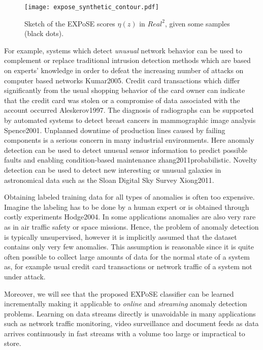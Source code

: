     \begin{figure}[tb]
    	\centering
    	\texttt{[image: expose\_synthetic\_contour.pdf]}
    	\caption{Sketch of the EXPoSE scores $\eta(z)$ in $Real^2$, given some samples (black dots).}
    	\label{fig:expose_synthetic_contour}
    \end{figure}
    

%
For example, systems which detect \emph{unusual} network behavior can be used to complement or replace traditional intrusion detection methods which are based on experts' knowledge in order to defeat the increasing number of attacks on computer based networks {Kumar2005}. Credit card transactions which differ significantly from the usual shopping behavior of the card owner can indicate that the credit card was stolen or a compromise of data associated with the account occurred {Aleskerov1997}.
The diagnosis of radiographs can be supported by automated systems to detect breast cancers in  mammographic image analysis {Spence2001}.
Unplanned downtime of production lines caused by failing components is a serious concern in many industrial environments. Here anomaly detection can be used to detect unusual sensor information to predict possible faults and enabling condition-based maintenance {zhang2011probabilistic}.
Novelty detection can be used to detect new interesting or unusual galaxies in astronomical data such as the Sloan Digital Sky Survey {Xiong2011}.

Obtaining labeled training data for all types of anomalies is often too expensive. Imagine the labeling has to be done by a human expert or is obtained through costly experiments {Hodge2004}. In some applications anomalies are also very rare as in air traffic safety or space missions. Hence, the problem of anomaly detection is typically unsupervised, however it is implicitly assumed that the dataset contains only very few anomalies. This assumption is reasonable since it is quite often possible to collect large amounts of data for the normal state of a system as, for example usual credit card transactions or network traffic of a system not under attack.

Moreover, we will see that the proposed EXPoSE classifier can be learned incrementally making it applicable to \emph{online} and \emph{streaming} anomaly detection problems. 
Learning on data streams directly is unavoidable in many applications such as network traffic monitoring, video surveillance and document feeds as data arrives continuously in fast streams with a volume too large or impractical to store.

